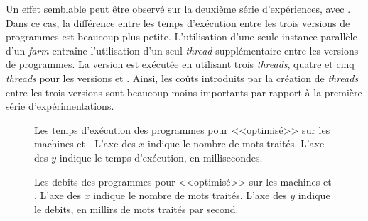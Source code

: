 Un effet semblable peut \^etre observ\'e sur la deuxi\`eme s\'erie d'exp\'eriences, avec . Dans ce cas, la diff\'erence entre les temps d'ex\'ecution entre les trois versions de programmes est beaucoup plus petite. L'utilisation d'une seule instance parall\`ele d'un \emph{farm} entra\^ine l'utilisation d'un seul \emph{thread} suppl\'ementaire entre les versions de programmes. La version  est ex\'ecut\'ee en utilisant trois \emph{threads}, quatre et cinq \emph{threads} pour les versions  et . Ainsi, les co\^uts introduits par la cr\'eation de \emph{threads} entre les trois versions sont beaucoup moins importants par rapport \`a la premi\`ere s\'erie d'exp\'erimentations. 










\begin{figure}


\caption[Les temps d'exécution des programmes pour 
<<optimisé>> sur les machines  et .]{Les temps d'exécution des
programmes pour  <<optimisé>> sur les machines  et
. L'axe des $x$ indique le nombre de mots traités. L'axe des $y$
indique le temps d'exécution, en millisecondes.}
\label{WordCount-merged-temps.fig}
\end{figure}


\begin{figure}


\caption[Les debits des programmes pour 
<<optimisé>> sur les machines  et .]{Les debits des
programmes pour  <<optimisé>> sur les machines  et
. L'axe des $x$ indique le nombre de mots traités. L'axe des $y$
indique le debits, en millirs de mots traités par second.}
\label{WordCount-merged-debit.fig}
\end{figure}


